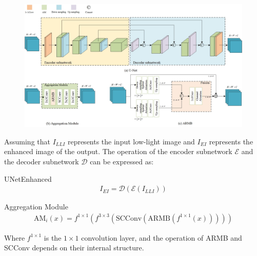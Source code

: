 \documentclass[CJK,aspectratio=169]{beamer}  %
\begin{document}
\begin{frame}
		\begin{figure}
			\centering
			\begin{minipage}{.65\textwidth}
				\includegraphics[width=0.85\linewidth]{picture/LLIE/My Architecture/U-Net and AM.jpg}
				\captionsetup{font=scriptsize}
				\label{fig: U-Net and AM}	
				\caption*{UNetEnhanced Method}
			\end{minipage}
			\captionsetup{font=scriptsize}
			\caption{
				\label{fig: CNN Branch}
			}
		\end{figure}
		
	\end{frame}
	
	\begin{frame}	
		
		Assuming that $I_{LLI}$ represents the input low-light image and $I_{EI}$ represents the enhanced image of the output. The operation of the encoder subnetwork $\mathcal{E}$ and the decoder subnetwork $\mathcal{D}$ can be expressed as:
		\begin{block}{UNetEnhanced}
			\begin{equation}
				\begin{aligned}
					I_{EI} = \mathcal{D} \left( \mathcal{E} \left( I_{LLI} \right) \right)
				\end{aligned}
				\label{eq: UNetEnhance model}
			\end{equation}
		\end{block}
		
		\begin{block}{Aggregation Module}
			\begin{equation}
				\begin{aligned}
					\text{AM}_{i}(x) = f^{1 \times 1} \left(f^{3 \times 3} \left(\text{SCConv}\left( \text{ARMB} \left( f^{1 \times 1} (x)\right)\right)\right)\right)
				\end{aligned}
			\end{equation}
		\end{block}
		
		Where $f ^ {1 \times 1} $ is the $1 \times 1$ convolution layer, and the operation of ARMB and SCConv depends on their internal structure.
	\end{frame}
	
\end{document}
